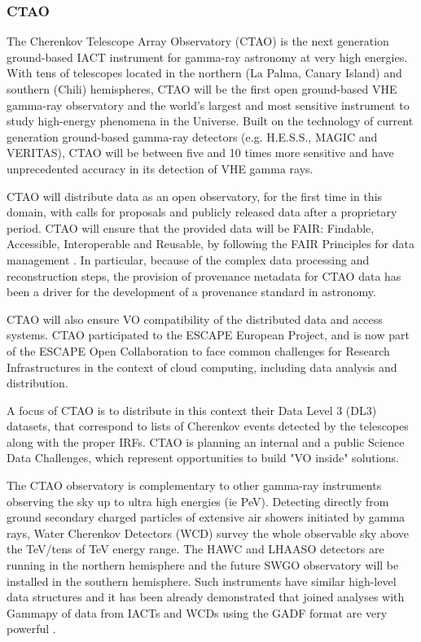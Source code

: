 \documentclass[11pt,a4paper]{ivoa}
\begin{document}
\subsubsection{CTAO}
\label{sec:ctao}

The Cherenkov Telescope Array Observatory (CTAO) is the next generation ground-based IACT instrument for gamma-ray astronomy
at very high energies. With tens of telescopes located in the northern (La Palma, Canary Island)
and southern (Chili) hemispheres, CTAO will be the  first open ground-based VHE gamma-ray observatory and the world’s
largest and most sensitive instrument to study  high-energy phenomena in the Universe. Built on the technology of current
generation ground-based gamma-ray detectors (e.g. H.E.S.S., MAGIC and VERITAS), CTAO will be between five and 10 times
more sensitive and have unprecedented accuracy  in its detection of VHE gamma rays.

CTAO will distribute data as an open observatory, for the first time in this domain, with calls for proposals and
publicly released data after a proprietary period. CTAO will ensure that the provided data will be FAIR: Findable,
Accessible, Interoperable and Reusable, by following the FAIR Principles for data management \citep{Wilkinson2016}.
In particular, because of the complex data processing and reconstruction steps, the provision of provenance metadata
for CTAO data has been a driver for the development of a provenance standard in astronomy.

CTAO will also ensure VO compatibility of the distributed data and access systems. CTAO participated to the ESCAPE
European Project, and is now part of the ESCAPE Open Collaboration to face common challenges for Research Infrastructures
in the context of cloud computing, including data analysis and distribution.

A focus of CTAO is to distribute in this context their Data Level 3 (DL3) datasets, that correspond to lists of Cherenkov
events detected by the telescopes along with the proper IRFs. CTAO is planning an internal and a public Science Data
Challenges, which represent opportunities to build "VO inside" solutions.

The CTAO observatory is complementary to other gamma-ray instruments observing the sky up to ultra high energies (ie PeV).
Detecting directly from ground secondary charged particles of extensive air showers initiated by gamma rays, Water
Cherenkov Detectors (WCD) survey the whole observable sky above the TeV/tens of TeV energy range. The HAWC and LHAASO
detectors are running in the northern hemisphere and the future SWGO observatory will be installed in the southern
hemisphere. Such instruments have similar high-level data structures and it has been already demonstrated that joined
analyses with Gammapy of data from IACTs and WCDs using the GADF format are very powerful \citep{2022A&A...667A..36A}.
\end{document}
